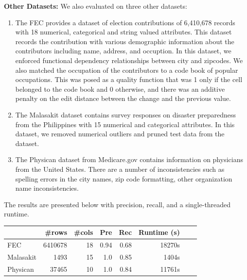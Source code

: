 \vspace{0.5em}\noindent\textbf{Other Datasets: } We also evaluated \sys on three  other datasets:
\begin{enumerate}
    \item The FEC provides a dataset of election contributions of 6,410,678 records with 18 numerical, categorical and string valued attributes. This dataset records the contribution with various demographic information about the contributors including name, address, and occuption.
    In this dataset, we enforced functional dependency relationships between city and zipcodes. We also matched the occupation of the contributors to a code book of popular occupations. This was posed as a quality function that was 1 only if the cell belonged to the code book and 0 otherwise, and there was an additive penalty on the edit distance between the change and the previous value.   
    \item The Malasakit dataset contains survey responses on disaster preparedness from the Philippines with 15 numerical and categorical attributes. In this dataset, we removed numerical outliers and pruned test data from the dataset. 
    \item The Physican dataset from  Medicare.gov contains information on physicians from the United States. There are a number of inconsistencies such as  spelling errors in the city names, zip code formatting, other organization name inconsistencies.
\end{enumerate}

The results are presented below with precision, recall, and a single-threaded runtime.
\begin{table}[ht]
\footnotesize
\centering
\begin{tabular}{|l|r|r|r|r|r|r|r|}
\hline
 & \#rows & \#cols & Pre & Rec & Runtime (s) \\
\hline
\hline
FEC	&6410678&18&0.94&	0.68&	18270s\\
\hline
Malasakit &1493& 15& 1.0 & 0.85& 1404s\\
\hline
Physican	&37465&10&1.0&0.84& 11761s\\
\hline
\end{tabular}
\end{table}

